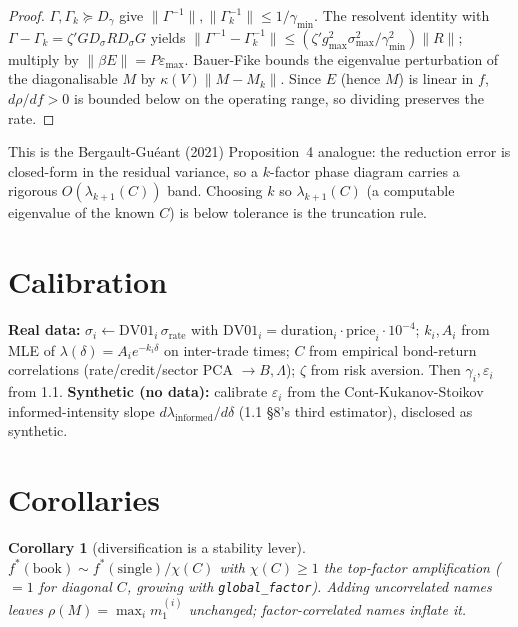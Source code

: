 \documentclass[11pt]{article}
\newtheorem{corollary}{Corollary}
\newcommand{\eps}{\varepsilon}
\newcommand{\code}[1]{\texttt{#1}}
\newcommand{\Gam}{\Gamma}
\newcommand{\Mmat}{M}
\begin{document}
\begin{proof}
$\Gam,\Gam_k\succeq D_\gamma$ give $\|\Gam^{-1}\|,\|\Gam_k^{-1}\|\le1/\gamma_{\min}$.
The resolvent identity with $\Gam-\Gam_k=\zeta'GD_\sigma RD_\sigma G$ yields
$\|\Gam^{-1}-\Gam_k^{-1}\|\le(\zeta'g_{\max}^2\sigma_{\max}^2/\gamma_{\min}^2)\|R\|$;
multiply by $\|\beta E\|=P\eps_{\max}$. Bauer-Fike bounds the eigenvalue
perturbation of the diagonalisable $\Mmat$ by $\kappa(V)\|\Mmat-\Mmat_k\|$. Since
$E$ (hence $\Mmat$) is linear in $f$, $d\rho/df>0$ is bounded below on the operating
range, so dividing preserves the rate.
\end{proof}

\noindent This is the Bergault-Gu\'eant (2021) Proposition~4 analogue: the reduction
error is closed-form in the residual variance, so a $k$-factor phase diagram carries
a rigorous $O(\lambda_{k+1}(C))$ band. Choosing $k$ so $\lambda_{k+1}(C)$ (a
computable eigenvalue of the known $C$) is below tolerance is the truncation rule.

\section{Calibration}

\textbf{Real data:} $\sigma_i\leftarrow \mathrm{DV01}_i\,\sigma_{\mathrm{rate}}$ with
$\mathrm{DV01}_i=\text{duration}_i\cdot\text{price}_i\cdot10^{-4}$; $k_i,A_i$ from
MLE of $\lambda(\delta)=A_ie^{-k_i\delta}$ on inter-trade times; $C$ from empirical
bond-return correlations (rate/credit/sector PCA $\to B,\Lambda$); $\zeta$ from risk
aversion. Then $\gamma_i,\eps_i$ from 1.1. \textbf{Synthetic (no data):} calibrate
$\eps_i$ from the Cont-Kukanov-Stoikov informed-intensity slope
$d\lambda_{\mathrm{informed}}/d\delta$ (1.1 \S8's third estimator), disclosed as
synthetic.

\section{Corollaries}

\begin{corollary}[diversification is a stability lever]
$f^*(\text{book})\sim f^*(\text{single})/\chi(C)$ with $\chi(C)\ge1$ the top-factor
amplification ($=1$ for diagonal $C$, growing with \code{global\_factor}). Adding
uncorrelated names leaves $\rho(\Mmat)=\max_i m_1^{(i)}$ unchanged; factor-correlated
names inflate it.
\end{corollary}
\end{document}
